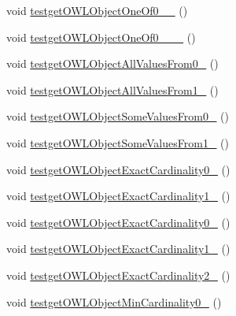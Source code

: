\begin{DoxyCompactItemize}
\item 
void \hyperlink{classorg_1_1semanticweb_1_1owlapi_1_1api_1_1test_1_1_null_check_test_case_a1446dd9e53b970cf080e41b43a041ea6}{testget\-O\-W\-L\-Object\-One\-Of0\-\_\-\_} ()
\item 
void \hyperlink{classorg_1_1semanticweb_1_1owlapi_1_1api_1_1test_1_1_null_check_test_case_ac0a6280026940698aacf6bff9b0f0eeb}{testget\-O\-W\-L\-Object\-One\-Of0\-\_\-\_\-\_} ()
\item 
void \hyperlink{classorg_1_1semanticweb_1_1owlapi_1_1api_1_1test_1_1_null_check_test_case_a2f7319174aeea8b2dc76e1478293f7db}{testget\-O\-W\-L\-Object\-All\-Values\-From0\-\_} ()
\item 
void \hyperlink{classorg_1_1semanticweb_1_1owlapi_1_1api_1_1test_1_1_null_check_test_case_affb8f16d782aeb9d5b34eb97b5b2fbc1}{testget\-O\-W\-L\-Object\-All\-Values\-From1\-\_} ()
\item 
void \hyperlink{classorg_1_1semanticweb_1_1owlapi_1_1api_1_1test_1_1_null_check_test_case_a8c345cf288eec94b467193478721ff0f}{testget\-O\-W\-L\-Object\-Some\-Values\-From0\-\_} ()
\item 
void \hyperlink{classorg_1_1semanticweb_1_1owlapi_1_1api_1_1test_1_1_null_check_test_case_aeabde988ee80653be00ad98f475955f5}{testget\-O\-W\-L\-Object\-Some\-Values\-From1\-\_} ()
\item 
void \hyperlink{classorg_1_1semanticweb_1_1owlapi_1_1api_1_1test_1_1_null_check_test_case_ac0987b11f8facaef5715a3859a3ce453}{testget\-O\-W\-L\-Object\-Exact\-Cardinality0\-\_} ()
\item 
void \hyperlink{classorg_1_1semanticweb_1_1owlapi_1_1api_1_1test_1_1_null_check_test_case_a3416dee9216a09feab4df4e4e34942aa}{testget\-O\-W\-L\-Object\-Exact\-Cardinality1\-\_} ()
\item 
void \hyperlink{classorg_1_1semanticweb_1_1owlapi_1_1api_1_1test_1_1_null_check_test_case_a8466e141cba3baffc8fd697709e78db4}{testget\-O\-W\-L\-Object\-Exact\-Cardinality0\-\_} ()
\item 
void \hyperlink{classorg_1_1semanticweb_1_1owlapi_1_1api_1_1test_1_1_null_check_test_case_aafecd3ee1c465373f1fe1ecbebaa0191}{testget\-O\-W\-L\-Object\-Exact\-Cardinality1\-\_} ()
\item 
void \hyperlink{classorg_1_1semanticweb_1_1owlapi_1_1api_1_1test_1_1_null_check_test_case_a1f9250cec7bfc5a7c3f04f13fd6aaffb}{testget\-O\-W\-L\-Object\-Exact\-Cardinality2\-\_} ()
\item 
void \hyperlink{classorg_1_1semanticweb_1_1owlapi_1_1api_1_1test_1_1_null_check_test_case_aae58f5e695041d8e2ddc95ecca3a0851}{testget\-O\-W\-L\-Object\-Min\-Cardinality0\-\_} ()

\end{DoxyCompactItemize}

